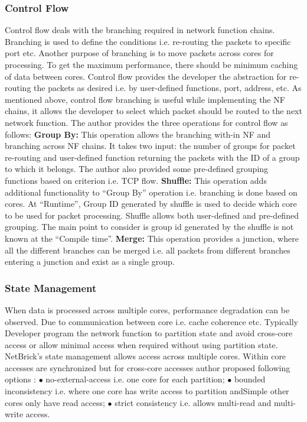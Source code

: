 \documentclass[10pt, a4paper, conference]{IEEEtran}
\begin{document}
\subsubsection{Control Flow}
Control flow deals with the branching required in network function chains. Branching is used to define the conditions i.e. re-routing the packets to specific port etc. Another purpose of branching is to move packets across cores for processing. To get the maximum performance, there should be minimum caching of data between cores. Control flow provides the developer the abstraction for re-routing the packets as desired i.e. by user-defined functions, port, address, etc. As mentioned above, control flow branching is useful while implementing the NF chains, it allows the developer to select which packet should be routed to the next network function. The author provides the three operations for control flow \cite{Panda2016} as follows: 
\newline
\textbf{Group By:} This operation allows the branching with-in NF and branching across NF chains. It takes two input: the number of groups for packet re-routing and user-defined function returning the packets with the ID of a group to which it belongs. The author also provided some pre-defined grouping functions based on criterion i.e. TCP flow.
\newline
\textbf{Shuffle:} This operation adds additional functionality to “Group By” operation i.e. branching is done based on cores. At “Runtime”, Group ID generated by shuffle is used to decide which core to be used for packet processing. Shuffle allows both user-defined and pre-defined grouping. The main point to consider is group id generated by the shuffle is not known at the “Compile time”. 
\newline
\textbf{Merge:} This operation provides a junction, where all the different branches can be merged i.e. all packets from different branches entering a junction and exist as a single group.

\subsubsection{State Management}
When data is processed across multiple cores, performance degradation can be observed. Due to communication between core i.e. cache coherence etc. Typically Developer program the network function to partition state and avoid cross-core access or allow minimal access when required without using partition state. NetBrick’s state management allows access across multiple cores. Within core accesses are synchronized but for cross-core accesses author proposed following options \cite{Panda2016}: $\bullet$ no-external-access i.e. one core for each partition; $\bullet$ bounded inconsistency\cite{Panda2017} i.e. where one core has write access to partition andSimple other cores only have read access; $\bullet$ strict consistency i.e. allows multi-read and multi-write access.
\end{document}
